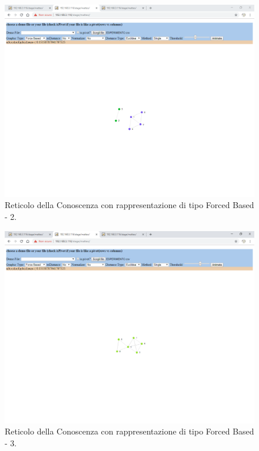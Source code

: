\noindent
\begin{figure}[H]
\centering
	\includegraphics[width=1\linewidth]{./image/reticoloCorretto4.png}
	\caption{Reticolo della Conoscenza con rappresentazione di tipo Forced Based - 2.}
	\label{Reticolo della Conoscenza con rappresentazione di tipo Forced Based - 2.}
\end{figure}
\noindent
\begin{figure}[H]
\centering
	\includegraphics[width=1\linewidth]{./image/reticoloCorretto5.png}
	\caption{Reticolo della Conoscenza con rappresentazione di tipo Forced Based - 3.}
	\label{Reticolo della Conoscenza con rappresentazione di tipo Forced Based - 3.}
\end{figure}
